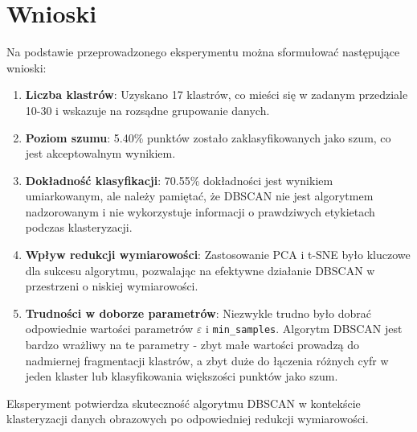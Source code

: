 \documentclass[12pt,a4paper]{article}
\begin{document}
\section{Wnioski}
Na podstawie przeprowadzonego eksperymentu można sformułować następujące wnioski:
\begin{enumerate}
\item \textbf{Liczba klastrów}: Uzyskano 17 klastrów, co mieści się w zadanym przedziale 10-30 i wskazuje na rozsądne grupowanie danych.
\item \textbf{Poziom szumu}: 5.40\% punktów zostało zaklasyfikowanych jako szum, co jest akceptowalnym wynikiem.

\item \textbf{Dokładność klasyfikacji}: 70.55\% dokładności jest wynikiem umiarkowanym, ale należy pamiętać, że DBSCAN nie jest algorytmem nadzorowanym i nie wykorzystuje informacji o prawdziwych etykietach podczas klasteryzacji.

\item \textbf{Wpływ redukcji wymiarowości}: Zastosowanie PCA i t-SNE było kluczowe dla sukcesu algorytmu, pozwalając na efektywne działanie DBSCAN w przestrzeni o niskiej wymiarowości.

\item \textbf{Trudności w doborze parametrów}: Niezwykle trudno było dobrać odpowiednie wartości parametrów $\varepsilon$ i \texttt{min\_samples}. Algorytm DBSCAN jest bardzo wrażliwy na te parametry - zbyt małe wartości prowadzą do nadmiernej fragmentacji klastrów, a zbyt duże do łączenia różnych cyfr w jeden klaster lub klasyfikowania większości punktów jako szum.
\end{enumerate}

\noindent Eksperyment potwierdza skuteczność algorytmu DBSCAN w kontekście klasteryzacji danych obrazowych po odpowiedniej redukcji wymiarowości.
\end{document}
